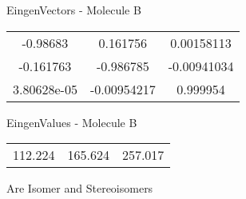 \begin{multicols}{2}
\begin{center}
\vtab
 EingenVectors - Molecule B     \\
\vtab
\begin{tabular}{|c c c|}
-0.98683	 & 	0.161756	 & 	0.00158113	 \\
-0.161763	 & 	-0.986785	 & 	-0.00941034	 \\
3.80628e-05	 & 	-0.00954217	 & 	0.999954
\end{tabular}

\vtab
 EingenValues - Molecule B     \\
\vtab
\begin{tabular}{|c c c|}
112.224	 & 	165.624	 & 	257.017
\end{tabular}

\end{center}
\end{multicols}
\begin{center}
\vtab
\vtab
\textcolor{NavyBlue}{\Large Are Isomer and Stereoisomers}
\end{center}
\newpage

